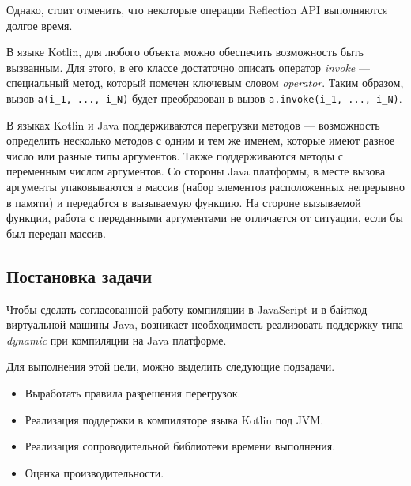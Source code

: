 Однако, стоит отменить, что некоторые операции Reflection API выполняются долгое время.


В языке Kotlin, для любого объекта можно обеспечить возможность быть вызванным. Для этого, в его классе достаточно описать оператор \textit{invoke} --- специальный метод, который помечен ключевым словом \textit{operator}. Таким образом, вызов \texttt{a(i_1, ..., i_N)} будет преобразован в вызов \texttt{a.invoke(i_1, ..., i_N)}.

В языках Kotlin и Java поддерживаются перегрузки методов --- возможность определить несколько методов с одним и тем же именем, которые имеют разное число или разные типы аргументов. Также поддерживаются методы с переменным числом аргументов. Со стороны Java платформы, в месте вызова аргументы упаковываются в массив (набор элементов расположенных непрерывно в памяти) и передабтся в вызываемую функцию. На стороне вызываемой функции, работа с переданными аргументами не отличается от ситуации, если бы был передан массив.



\subsection{Постановка задачи}

Чтобы сделать согласованной работу компиляции в JavaScript и в байткод виртуальной машины Java, возникает необходимость реализовать поддержку типа \textit{dynamic} при компиляции на Java платформе.

Для выполнения этой цели, можно выделить следующие подзадачи.
\begin{itemize}
    \item Выработать правила разрешения перегрузок.
    \item Реализация поддержки в компиляторе языка Kotlin под JVM.
    \item Реализация сопроводительной библиотеки времени выполнения.
    \item Оценка производительности.
\end{itemize}

